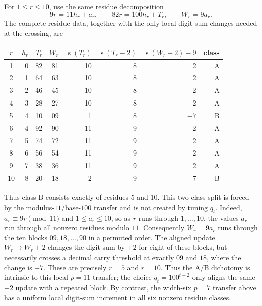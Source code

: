 \documentclass[11pt]{article}
\newcommand{\ds}{\operatorname{s}}
\begin{document}
For $1\le r\le10$, use the same residue decomposition
\begin{equation}\label{eq:11resdata}
 9r=11h_r+a_r,
 \qquad
 82r=100h_r+T_r,
 \qquad
 W_r=9a_r.
\end{equation}
The complete residue data, together with the only local digit-sum changes needed at the crossing, are
\begin{center}
\small
\begin{tabular}{@{}c|rrrrrrr@{}}
\toprule
$r$&$h_r$&$T_r$&$W_r$&$\ds(T_r)$&$\ds(T_r-2)$&$\ds(W_r+2)-9$&class\\
\midrule
1&0&82&81&10&8& 2&A\\
2&1&64&63&10&8& 2&A\\
3&2&46&45&10&8& 2&A\\
4&3&28&27&10&8& 2&A\\
5&4&10&09& 1&8&$-7$&B\\
6&4&92&90&11&9& 2&A\\
7&5&74&72&11&9& 2&A\\
8&6&56&54&11&9& 2&A\\
9&7&38&36&11&9& 2&A\\
10&8&20&18&2&9&$-7$&B\\
\bottomrule
\end{tabular}
\end{center}
Thus class B consists exactly of residues $5$ and $10$.  This two-class split is forced by the modulus-$11$/base-$100$ transfer and is not created by tuning $q_t$.  Indeed, $a_r\equiv9r\pmod{11}$ and $1\le a_r\le10$, so as $r$ runs through $1,\ldots,10$, the values $a_r$ run through all nonzero residues modulo $11$.  Consequently $W_r=9a_r$ runs through the ten blocks $09,18,\ldots,90$ in a permuted order.  The aligned update $W_r\mapsto W_r+2$ changes the digit sum by $+2$ for eight of these blocks, but necessarily crosses a decimal carry threshold at exactly $09$ and $18$, where the change is $-7$.  These are precisely $r=5$ and $r=10$.  Thus the A/B dichotomy is intrinsic to this local $p=11$ transfer; the choice $q_t=100^{t+2}$ only aligns the same $+2$ update with a repeated block.  By contrast, the width-six $p=7$ transfer above has a uniform local digit-sum increment in all six nonzero residue classes.
\end{document}
